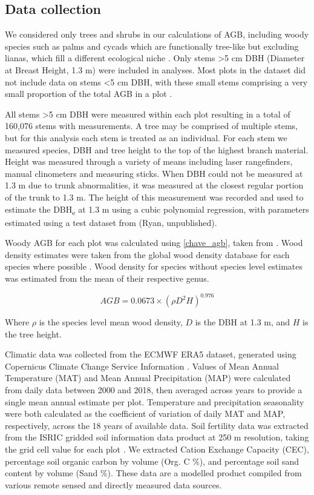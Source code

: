 \documentclass[11pt,a4paper]{article}
\begin{document}
\subsection{Data collection}
 
We considered only trees and shrubs in our calculations of AGB, including woody species such as palms and cycads which are functionally tree-like but excluding lianas, which fill a different ecological niche \citep{Selaya2008}. Only stems >5 cm DBH (Diameter at Breast Height, 1.3 m) were included in analyses. Most plots in the dataset did not include data on stems <5 cm DBH, with these small stems comprising a very small proportion of the total AGB in a plot \citep{}.


All stems >5 cm DBH were measured within each plot resulting in a total of 160,076 stems with measurements. A tree may be comprised of multiple stems, but for this analysis each stem is treated as an individual. For each stem we measured species, DBH and tree height to the top of the highest branch material. Height was measured through a variety of means including laser rangefinders, manual clinometers and measuring sticks. When DBH could not be measured at 1.3 m due to trunk abnormalities, it was measured at the closest regular portion of the trunk to 1.3 m. The height of this measurement was recorded and used to estimate the DBH\textsubscript{e} at 1.3 m using a cubic polynomial regression, with parameters estimated using a test dataset from (Ryan, unpublished).

Woody AGB for each plot was calculated using \autoref{chave_agb}, taken from \citet{Chave2014}. Wood density estimates were taken from the global wood density database for each species where possible \citep{Chave2009, Zanne2009}. Wood density for species without species level estimates was estimated from the mean of their respective genus. 

\begin{equation}
	AGB = 0.0673 \times (\rho D^{2} H)^{0.976}
	\label{chave_agb}
\end{equation}

Where $\rho$ is the species level mean wood density, $D$ is the DBH at 1.3 m, and $H$ is the tree height.

Climatic data was collected from the ECMWF ERA5 dataset, generated using Copernicus Climate Change Service Information \citep{ERA5}. Values of Mean Annual Temperature (MAT) and Mean Annual Precipitation (MAP) were calculated from daily data between 2000 and 2018, then averaged across years to provide a single mean annual estimate per plot. Temperature and precipitation seasonality were both calculated as the coefficient of variation of daily MAT and MAP, respectively, across the 18 years of available data. Soil fertility data was extracted from the ISRIC gridded soil information data product at 250 m resolution, taking the grid cell value for each plot \citep{Hengl2017}. We extracted Cation Exchange Capacity (CEC), percentage soil organic carbon by volume (Org. C \%), and percentage soil sand content by volume (Sand \%). These data are a modelled product compiled from various remote sensed and directly measured data sources. 
\end{document}
